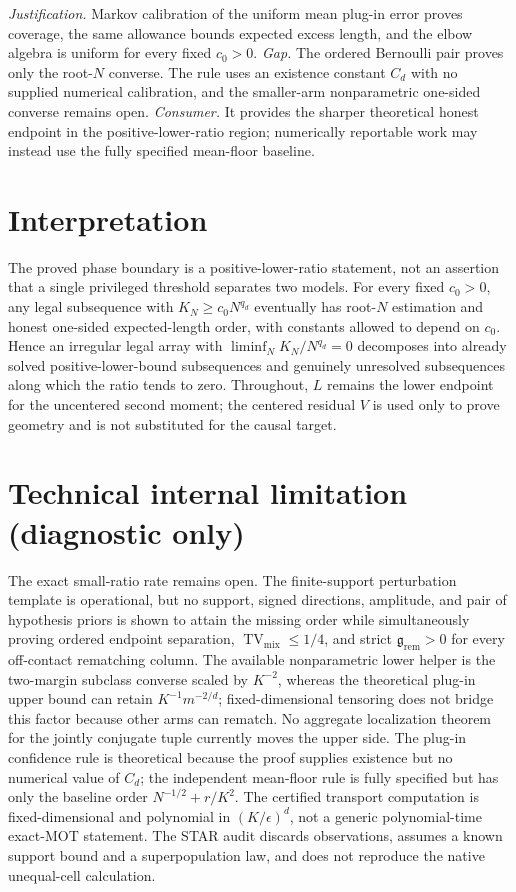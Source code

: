 \documentclass{article}
\begin{document}
\par\smallskip\noindent \textit{Justification.} Markov calibration of the uniform mean plug-in error proves coverage, the same allowance bounds expected excess length, and the elbow algebra is uniform for every fixed \(c_0>0\). \textit{Gap.} The ordered Bernoulli pair proves only the root-\(N\) converse.  The rule uses an existence constant \(C_d\) with no supplied numerical calibration, and the smaller-arm nonparametric one-sided converse remains open. \textit{Consumer.} It provides the sharper theoretical honest endpoint in the positive-lower-ratio region; numerically reportable work may instead use the fully specified mean-floor baseline.

\section{Interpretation}

The proved phase boundary is a positive-lower-ratio statement, not an assertion that a single privileged threshold separates two models.  For every fixed \(c_0>0\), any legal subsequence with \(K_N\ge c_0N^{q_d}\) eventually has root-\(N\) estimation and honest one-sided expected-length order, with constants allowed to depend on \(c_0\).  Hence an irregular legal array with \(\liminf_NK_N/N^{q_d}=0\) decomposes into already solved positive-lower-bound subsequences and genuinely unresolved subsequences along which the ratio tends to zero.  Throughout, \(L\) remains the lower endpoint for the uncentered second moment; the centered residual \(V\) is used only to prove geometry and is not substituted for the causal target.

\section*{Technical internal limitation (diagnostic only)}

The exact small-ratio rate remains open.  The finite-support perturbation template is operational, but no support, signed directions, amplitude, and pair of hypothesis priors is shown to attain the missing order while simultaneously proving ordered endpoint separation, \(\operatorname{TV}_{\mathrm{mix}}\le1/4\), and strict \(\mathfrak g_{\mathrm{rem}}>0\) for every off-contact rematching column.  The available nonparametric lower helper is the two-margin subclass converse scaled by \(K^{-2}\), whereas the theoretical plug-in upper bound can retain \(K^{-1}m^{-2/d}\); fixed-dimensional tensoring does not bridge this factor because other arms can rematch.  No aggregate localization theorem for the jointly conjugate tuple currently moves the upper side.  The plug-in confidence rule is theoretical because the proof supplies existence but no numerical value of \(C_d\); the independent mean-floor rule is fully specified but has only the baseline order \(N^{-1/2}+r/K^2\).  The certified transport computation is fixed-dimensional and polynomial in \((K/\epsilon)^d\), not a generic polynomial-time exact-MOT statement.  The STAR audit discards observations, assumes a known support bound and a superpopulation law, and does not reproduce the native unequal-cell calculation.
\end{document}
